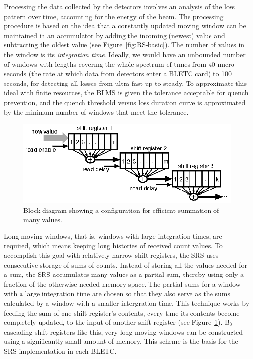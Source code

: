 \documentclass{llncs}
\begin{document}
Processing the data collected by the detectors involves an analysis of the loss pattern over time, accounting for the energy of the beam.
The processing procedure is based on the idea that a constantly updated moving window can be maintained in an accumulator by adding the incoming (newest) value and subtracting the oldest value (see Figure~\ref{fig:RS-basic}).
The number of values in the window is its \emph{integration time}.
Ideally, we would have an unbounded number of windows with lengths covering the whole spectrum of times from 40 micro-seconds (the rate at which data from detectors enter a BLETC card) to 100 seconds, for detecting all losses from ultra-fast up to steady.
To approximate this ideal with finite resources, the BLMS is given the tolerance acceptable for quench prevention, and the quench threshold versus loss duration curve is approximated by the minimum number of windows that meet the tolerance.

\begin{figure}[t]
  \centering \includegraphics{SRS-basic.eps}
   \caption{Block diagram showing a configuration for efficient summation of many values.}
  \label{fig:SRS-basic}
\end{figure}

Long moving windows, that is, windows with large integration times, are required, which means keeping long histories of received count values.
To accomplish this goal with relatively narrow shift registers, the SRS uses consecutive storage of sums of counts.
Instead of storing all the values needed for a sum, the SRS accumulates many values as a partial sum, thereby using only a fraction of the otherwise needed memory space.
The partial sums for a window with a large integration time are chosen so that they also serve as the sums calculated by a window with a smaller intergration time.
This technique works by feeding the sum of one shift register's contents, every time its contents become completely updated, to the input of another shift register (see Figure~\ref{fig:SRS-basic}).
By cascading shift registers like this, very long moving windows can be constructed using a significantly small amount of memory.
This scheme is the basis for the SRS implementation in each BLETC.
\end{document}
